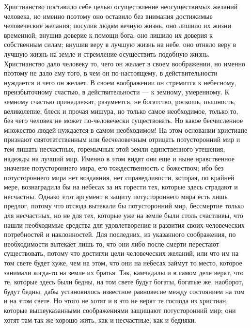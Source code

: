 \documentclass[12pt]{article}
\begin{document}
Христианство поставило себе целью осуществление неосуществимых желаний человека, но именно поэтому оно оставило без внимания достижимые человеческие желания; посулив людям вечную жизнь, оно лишило их жизни временной; внушив доверие к помощи бога, оно лишило их доверия к собственным силам; внушив веру в лучшую жизнь на небе, оно отняло веру в лучшую жизнь на земле и стремление осуществить подобную жизнь. Христианство дало человеку то, чего он желает в своем воображении, но именно поэтому не дало ему того, в чем он по-настоящему, в действительности нуждается и чего он желает. В своем воображении он стремится к небесному, преизбыточному счастью, в действительности --- к земному, умеренному. К земному счастью принадлежат, разумеется, не богатство, роскошь, пышность, великолепие, блеск и прочая мишура, но только самое необходимое, только то, без чего человек не может по-человечески существовать. Но какое бесчисленное множество людей нуждается в самом необходимом! На этом основании христиане признают святотатственным или бесчеловечным отрицать потусторонний мир и тем лишать несчастных, горемычных этой земли единственного утешения, надежды на лучший мир. Именно в этом видят они еще и ныне нравственное значение потустороннего мира, его тождественность с божеством; ибо без потустороннего мира нет воздаяния, нет справедливости, которая, по крайней мере, вознаградила бы на небесах за их горести тех, которые здесь страдают и несчастны. Однако этот аргумент в защиту потустороннего мира есть лишь предлог, потому что отсюда вытекали бы потусторонний мир, бессмертие только для несчастных, но не для тех, которые уже на земле были столь счастливы, что нашли необходимые средства для удовлетворения и развития своих человеческих потребностей и наклонностей. Для последних, из указанного соображения, по необходимости вытекает лишь то, что они либо после смерти перестают существовать, потому что достигли цели человеческих желаний, или что им на том свете будет хуже, чем на этом, что они на небесах займут то место, которое занимали когда-то на земле их братья. Так, камчадалы и в самом деле верят, что те, которые здесь были бедны, на том свете будут богаты, богатые же, наоборот, будут бедны, дабы установилось известное равновесие между состоянием на том и на этом свете. Но этого не хотят и в это не верят те господа из христиан, которые вышеуказанными соображениями защищают потусторонний мир; они хотят там так же хорошо жить, как и несчастные, как и бедняки. 
\end{document}
